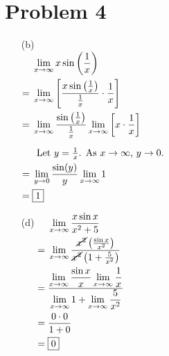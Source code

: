 \documentclass{article}
\newcommand{\alignedintertext}[1]{%
  \noalign{%
    \vskip\belowdisplayshortskip
    \vtop{\hsize=\linewidth#1\par
    \expandafter}%
    \expandafter\prevdepth\the\prevdepth
  }%
}
\newcommand*{\paren}[1]{\ensuremath\left(#1\right)}
\newcommand*{\problem}[1]{\section*{Problem #1}}
\newcommand*{\limit}[2][x]{\ensuremath{\displaystyle\lim_{#1\to#2}}}
\newcommand*{\Limit}[3][x]{\ensuremath{\displaystyle\lim_{#1\to#2}\left[#3\right]}}
\begin{document}
\problem{4}
\begin{multicols}{2}
\begin{itemize}
	\item[(b)]
	$\begin{aligned}[t]
		&\limit{\infty}x\sin\paren{\frac{1}{x}} \\
		={}&\Limit{\infty}{\frac{x\sin\paren{\frac{1}{x}}}{\frac{1}{x}}\cdot\frac{1}{x}} \\
		={}&\limit{\infty}\frac{\sin\paren{\frac{1}{x}}}{\frac{1}{x}}\Limit{\infty}{x\cdot\frac{1}{x}} \\
		\alignedintertext{Let $y=\frac{1}{x}$. As $x\to\infty$, $y\to0$.}
		={}&\limit[y]{0}\frac{\sin(y)}{y}\limit{\infty}1 \\
		={}&\boxed{1}
	\end{aligned}$

	\item[(d)]
	$\begin{aligned}[t]
		&\limit{\infty}\frac{x\sin x}{x^2+5} \\
		={}&\limit{\infty}\frac{\cancel{x^2}\paren{\frac{\sin x}{x^2}}}{\cancel{x^2}\paren{1+\frac{5}{x^2}}} \\
		={}&\frac{\limit{\infty}\frac{\sin x}{x}\limit{\infty}\frac{1}{x}}{\limit{\infty}1+\limit{\infty}\frac{5}{x^2}} \\
		={}&\frac{0\cdot0}{1+0} \\
		={}&\boxed{0}
	\end{aligned}$
\end{itemize}
\end{multicols}
\end{document}
